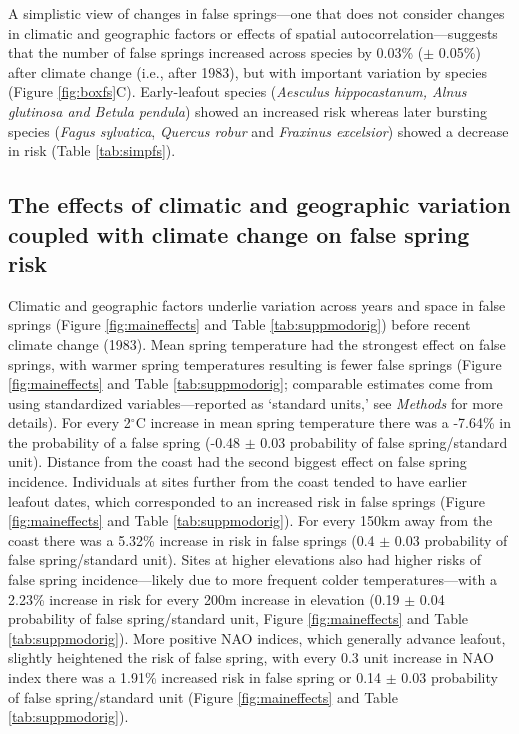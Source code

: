 \documentclass{article}\usepackage[]{graphicx}\usepackage[]{color}
\begin{document}
A simplistic view of changes in false springs---one that does not consider changes in climatic and geographic factors or effects of spatial autocorrelation---suggests that the number of false springs increased across species by 0.03\% ($\pm$ 0.05\%) after climate change (i.e., after 1983), but with important variation by species (Figure \ref{fig:boxfs}C). Early-leafout species (\textit{Aesculus hippocastanum, \textit{Alnus glutinosa} and \textit{Betula pendula}}) showed an increased risk whereas later bursting species (\textit{Fagus sylvatica}, \textit{Quercus robur} and \textit{Fraxinus excelsior}) showed a decrease in risk (Table \ref{tab:simpfs}). 


\subsection*{The effects of climatic and geographic variation coupled with climate change on false spring risk}
Climatic and geographic factors underlie variation across years and space in false springs (Figure \ref{fig:maineffects} and Table \ref{tab:suppmodorig}) before recent climate change (1983). Mean spring temperature had the strongest effect on false springs, with warmer spring temperatures resulting is fewer false springs (Figure \ref{fig:maineffects} and Table \ref{tab:suppmodorig}; comparable estimates come from using standardized variables---reported as `standard units,' see \textit{Methods} for more details). For every 2$^{\circ}$C increase in mean spring temperature there was a -7.64\% in the probability of a false spring (-0.48 $\pm$ 0.03 probability of false spring/standard unit). Distance from the coast had the second biggest effect on false spring incidence. Individuals at sites further from the coast tended to have earlier leafout dates, which corresponded to an increased risk in false springs (Figure \ref{fig:maineffects} and Table \ref{tab:suppmodorig}). For every 150km away from the coast there was a 5.32\% increase in risk in false springs (0.4 $\pm$ 0.03 probability of false spring/standard unit). Sites at higher elevations also had higher risks of false spring incidence---likely due to more frequent colder temperatures---with a 2.23\% increase in risk for every 200m increase in elevation (0.19 $\pm$ 0.04 probability of false spring/standard unit, Figure \ref{fig:maineffects} and Table \ref{tab:suppmodorig}). More positive NAO indices, which generally advance leafout, slightly heightened the risk of false spring, with every 0.3 unit increase in NAO index there was a 1.91\% increased risk in false spring or 0.14 $\pm$ 0.03 probability of false spring/standard unit (Figure \ref{fig:maineffects} and Table \ref{tab:suppmodorig}).  
\end{document}
